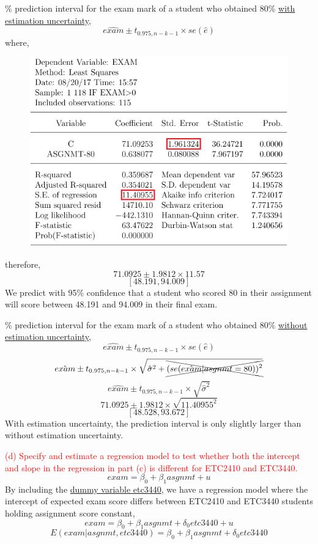 \documentclass[12pt]{report}
\begin{document}
\newpage
{}\% prediction interval for the exam mark of a student who obtained 80\% \uline{with estimation uncertainty},
$$\widehat{exam} \pm t_{0.975,n-k-1} \times se(\hat{e})$$
\noindent where,
\vspace{40mm}
\begin{figure}[H]
	\centering
	\includegraphics{q1_23}
\end{figure}
\vspace{-\baselineskip}
\noindent therefore,
$$71.0925 \pm 1.9812 \times 11.57$$
$$[48.191,94.009]$$
\noindent We predict with 95\% confidence that a student who scored 80 in their assignment will score between 48.191 and 94.009 in their final exam.

\newpage
{}\% prediction interval for the exam mark of a student who obtained 80\% \uline{without estimation uncertainty},
$$\hat{exam} \pm t_{0.975,n-k-1} \times se(\hat{e})$$
$$\hat{exam} \pm t_{0.975,n-k-1} \times \sqrt{\hat{\sigma}^2 + \xcancel{(se(\hat{exam}|asgnmt=80))^2}}$$
$$\hat{exam} \pm t_{0.975,n-k-1} \times \sqrt{\hat{\sigma}^2}$$
$$71.0925 \pm 1.9812 \times \sqrt{11.40955^2}$$
$$[48.528,93.672]$$
\noindent With estimation uncertainty, the prediction interval is only slightly larger than without estimation uncertainty.

\newpage
\noindent \textcolor{red}{(d) Specify and estimate a regression model to test whether both the intercept and slope in the regression in part (c) is different for ETC2410 and ETC3440.}
$$exam = \beta_0 + \beta_1asgnmt + u$$
\noindent By including the \uline{dummy variable etc3440}, we have a regression model where the intercept of expected exam score differs between ETC2410 and ETC3440 students holding assignment score constant,
$$exam = \beta_0 + \beta_1asgnmt + \delta_0etc3440 + u$$
$$E(exam|asgnmt,etc3440) = \beta_0 + \beta_1asgnmt + \delta_0etc3440$$
\end{document}
